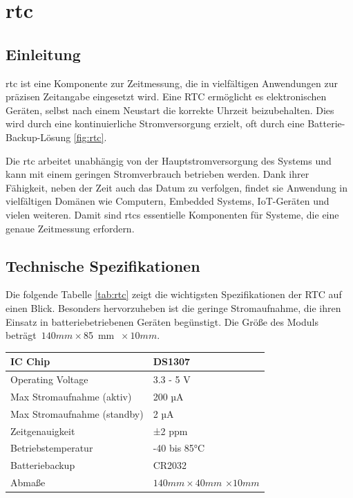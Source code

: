 



\chapter{\ac{rtc}}\label{RTC}

\section{Einleitung}

\ac{rtc} ist eine Komponente zur Zeitmessung, die in vielfältigen Anwendungen zur präzisen Zeitangabe eingesetzt wird. Eine RTC ermöglicht es elektronischen Geräten, selbst nach einem Neustart die korrekte Uhrzeit beizubehalten. Dies wird durch eine kontinuierliche Stromversorgung erzielt, oft durch eine Batterie-Backup-Lösung \ref{fig:rtc}.

Die \ac{rtc} arbeitet unabhängig von der Hauptstromversorgung des Systems und kann mit einem geringen Stromverbrauch betrieben werden. Dank ihrer Fähigkeit, neben der Zeit auch das Datum zu verfolgen, findet sie Anwendung in vielfältigen Domänen wie Computern, Embedded Systems, IoT-Geräten und vielen weiteren. Damit sind \ac{rtc}s essentielle Komponenten für Systeme, die eine genaue Zeitmessung erfordern.
 \cite{white2011}


\section{Technische Spezifikationen}

Die folgende Tabelle \ref{tab:rtc} zeigt die wichtigsten Spezifikationen der RTC auf einen Blick. Besonders hervorzuheben ist die geringe Stromaufnahme, die ihren Einsatz in batteriebetriebenen Geräten begünstigt. Die Größe des Moduls beträgt~$140 mm\times$85~mm $~\times10mm$.

\begin{center}
	\label{tab:rtc}
	\begin{tabular}{|l|p{8cm}|}
		\hline
		IC Chip & DS1307 \\
		\hline
		Operating Voltage & 3.3 - 5 V \\
		\hline
		Max Stromaufnahme (aktiv) & 200 µA \\
		\hline
		Max Stromaufnahme (standby) & 2 µA \\
		\hline
		Zeitgenauigkeit & ±2 ppm \\
		\hline
		Betriebstemperatur & -40 bis 85°C \\
		\hline
		Batteriebackup & CR2032 \\ 
		\hline
		Abmaße & $140 mm \times 40 mm$ $\times 10 mm$ 
	\end{tabular}
\end{center}

